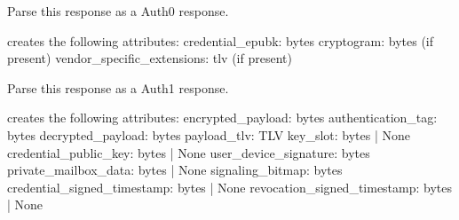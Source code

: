 \documentclass[letterpaper,10pt,english]{sphinxmanual}
\begin{document}
\begin{fulllineitems}
\begin{fulllineitems}
\end{fulllineitems}


\begin{fulllineitems}
\label{\detokenize{aliro_actuator.access_protocol.apdu:aliro_actuator.access_protocol.apdu.Response.parse_as_auth0}}
\pysigstartsignatures
{}
\pysigstopsignatures
\sphinxAtStartPar
Parse this response as a Auth0 response.

\sphinxAtStartPar
creates the following attributes:
credential\_epubk: bytes
cryptogram: bytes (if present)
vendor\_specific\_extensions: tlv (if present)

\end{fulllineitems}


\begin{fulllineitems}
\label{\detokenize{aliro_actuator.access_protocol.apdu:aliro_actuator.access_protocol.apdu.Response.parse_as_auth1}}
\pysigstartsignatures
{}
\pysigstopsignatures
\sphinxAtStartPar
Parse this response as a Auth1 response.

\sphinxAtStartPar
creates the following attributes:
encrypted\_payload: bytes
authentication\_tag: bytes
decrypted\_payload: bytes
payload\_tlv: TLV
key\_slot: bytes | None
credential\_public\_key: bytes | None
user\_device\_signature: bytes
private\_mailbox\_data: bytes | None
signaling\_bitmap: bytes
credential\_signed\_timestamp: bytes | None
revocation\_signed\_timestamp: bytes | None

\end{fulllineitems}



\end{fulllineitems}
\end{document}
